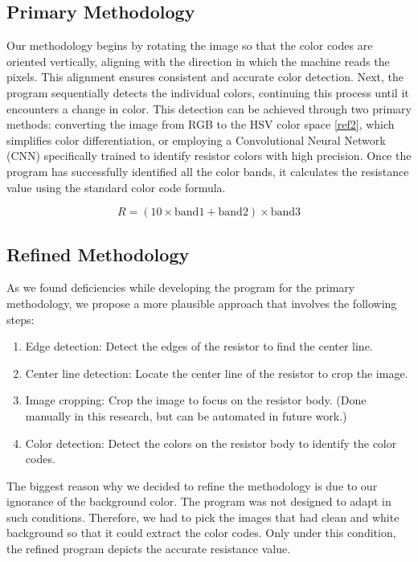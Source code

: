 \documentclass[preprint,12pt,3p,times]{elsarticle}
\begin{document}
\subsection{Primary Methodology}
Our methodology begins by rotating the image so that the color codes are oriented vertically, aligning with the direction in which the machine reads the pixels. This alignment ensures consistent and accurate color detection.
Next, the program sequentially detects the individual colors, continuing this process until it encounters a change in color. This detection can be achieved through two primary methods: converting the image from RGB to the HSV color space \ref{ref2}, which simplifies color differentiation, or employing a Convolutional Neural Network (CNN) specifically trained to identify resistor colors with high precision.
Once the program has successfully identified all the color bands, it calculates the resistance value using the standard color code formula.

\begin{equation}
    \label{eq_resistor}
    R = (10 \times \text{band1} + \text{band2}) \times \text{band3}
\end{equation} 

\subsection{Refined Methodology}
As we found deficiencies while developing the program for the primary methodology, we propose a more plausible approach that involves the following steps:
\begin{enumerate}
	\item Edge detection: Detect the edges of the resistor to find the center line.
	\item Center line detection: Locate the center line of the resistor to crop the image.
	\item Image cropping: Crop the image to focus on the resistor body. (Done manually in this research, but can be automated in future work.)
	\item Color detection: Detect the colors on the resistor body to identify the color codes.

\end{enumerate}
The biggest reason why we decided to refine the methodology is due to our ignorance of the background color. The program was not designed to adapt in such conditions. Therefore, we had to pick the images that had clean and white background so that it could extract the color codes. Only under this condition, the refined program depicts the accurate resistance value.
\end{document}
